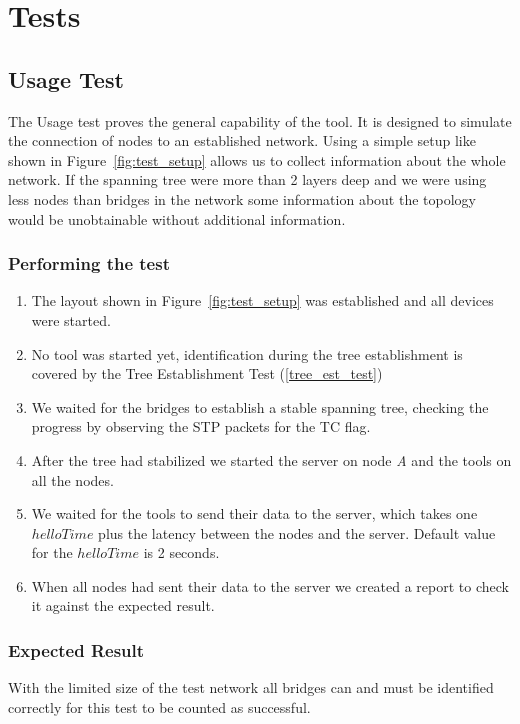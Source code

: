 \section{Tests}
\subsection{Usage Test}
\label{usage_test}
The Usage test proves the general capability of the tool.
It is designed to simulate the connection of nodes to an established network.
Using a simple setup like shown in Figure~\ref{fig:test_setup} allows us to collect information about the whole network.
If the spanning tree were more than 2 layers deep and we were using less nodes than bridges in the network some information about the topology would be unobtainable without additional information.

\subsubsection{Performing the test}
\begin{enumerate}
    \item The layout shown in Figure~\ref{fig:test_setup} was established and all devices were started.
    \item No tool was started yet, identification during the tree establishment is covered by the Tree Establishment Test (\ref{tree_est_test})
    \item We waited for the bridges to establish a stable spanning tree, checking the progress by observing the STP packets for the TC flag.
    \item After the tree had stabilized we started the server on node \textit{A} and the tools on all the nodes.
    \item We waited for the tools to send their data to the server, which takes one $helloTime$ plus the latency between the nodes and the server. Default value for the $helloTime$ is 2 seconds.
    \item When all nodes had sent their data to the server we created a report to check it against the expected result.
\end{enumerate}
\subsubsection{Expected Result}
With the limited size of the test network all bridges can and must be identified correctly for this test to be counted as successful.

